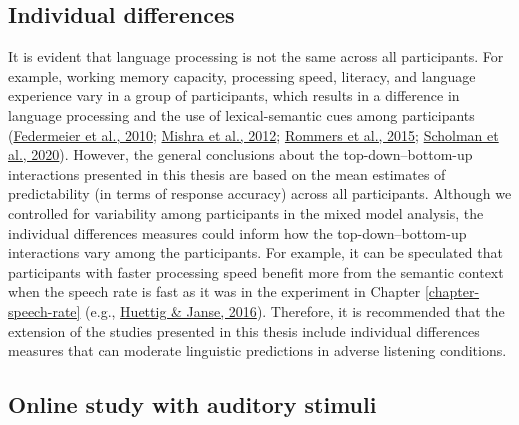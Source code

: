 \documentclass[a4paper, nobind]{templates/ociamthesis}
\begin{document}
\hypertarget{individual-differences}{%
\subsection{Individual differences}\label{individual-differences}}

It is evident that language processing is not the same across all participants.
For example, working memory capacity, processing speed, literacy, and language experience vary in a group of participants,
which results in a difference in language processing and the use of lexical-semantic cues among participants (\protect\hyperlink{ref-Federmeier2010}{Federmeier et al., 2010}; \protect\hyperlink{ref-Mishra2012}{Mishra et al., 2012}; \protect\hyperlink{ref-Rommers2015}{Rommers et al., 2015}; \protect\hyperlink{ref-Scholman2020}{Scholman et al., 2020}).
However, the general conclusions about the top-down--bottom-up interactions presented in this thesis are based on the mean estimates of predictability (in terms of response accuracy) across all participants.
Although we controlled for variability among participants in the mixed model analysis,
the individual differences measures could inform how the top-down--bottom-up interactions vary among the participants.
For example, it can be speculated that participants with faster processing speed benefit more from the semantic context when the speech rate is fast as it was in the experiment in Chapter \ref{chapter-speech-rate} (e.g., \protect\hyperlink{ref-Huettig2016a}{Huettig \& Janse, 2016}).
Therefore, it is recommended that the extension of the studies presented in this thesis include individual differences measures that can moderate linguistic predictions in adverse listening conditions.

\hypertarget{online-study-with-auditory-stimuli}{%
\subsection{Online study with auditory stimuli}\label{online-study-with-auditory-stimuli}}
\end{document}
